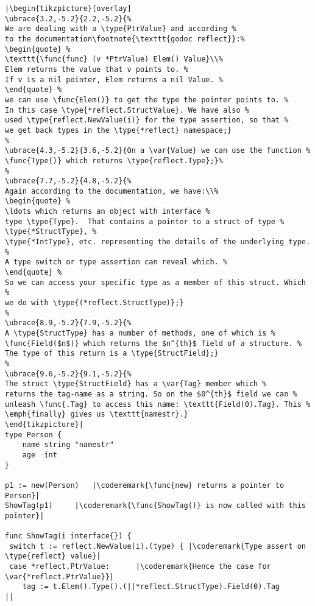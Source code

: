 \begin{lstlisting}[caption=Introspection using reflection,label=src:introspection]
|\begin{tikzpicture}[overlay]
\ubrace{3.2,-5.2}{2.2,-5.2}{%
We are dealing with a \type{PtrValue} and according %
to the documentation\footnote{\texttt{godoc reflect}}:%
\begin{quote} %
\texttt{\func{func} (v *PtrValue) Elem() Value}\\%
Elem returns the value that v points to. %
If v is a nil pointer, Elem returns a nil Value. %
\end{quote} %
we can use \func{Elem()} to get the type the pointer points to. %
In this case \type{*reflect.StructValue}. We have also %
used \type{reflect.NewValue(i)} for the type assertion, so that %
we get back types in the \type{*reflect} namespace;}
%
\ubrace{4.3,-5.2}{3.6,-5.2}{On a \var{Value} we can use the function %
\func{Type()} which returns \type{reflect.Type};}%
%
\ubrace{7.7,-5.2}{4.8,-5.2}{%
Again according to the documentation, we have:\\%
\begin{quote} %
\ldots which returns an object with interface %
type \type{Type}.  That contains a pointer to a struct of type %
\type{*StructType}, %
\type{*IntType}, etc. representing the details of the underlying type. %
A type switch or type assertion can reveal which. %
\end{quote} %
So we can access your specific type as a member of this struct. Which %
we do with \type{(*reflect.StructType)};}
%
\ubrace{8.9,-5.2}{7.9,-5.2}{%
A \type{StructType} has a number of methods, one of which is %
\func{Field($n$)} which returns the $n^{th}$ field of a structure. %
The type of this return is a \type{StructField};}
%
\ubrace{9.6,-5.2}{9.1,-5.2}{%
The struct \type{StructField} has a \var{Tag} member which %
returns the tag-name as a string. So on the $0^{th}$ field we can %
unleash \func{.Tag} to access this name: \texttt{Field(0).Tag}. This %
\emph{finally} gives us \texttt{namestr}.}
\end{tikzpicture}|
type Person {
    name string "namestr"
    age  int
}

p1 := new(Person)   |\coderemark{\func{new} returns a pointer to Person}|
ShowTag(p1)	    |\coderemark{\func{ShowTag()} is now called with this pointer}|

func ShowTag(i interface{}) {
 switch t := reflect.NewValue(i).(type) { |\coderemark{Type assert on \type{reflect} value}|
 case *reflect.PtrValue:	  |\coderemark{Hence the case for \var{*reflect.PtrValue}}|
	tag := t.Elem().Type().(||*reflect.StructType).Field(0).Tag
||
\end{lstlisting}
